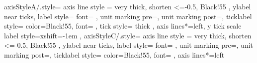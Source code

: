 





\pgfplotsset
{
	axisStyleA/.style=
	{
		axis line style =
		{
			very thick,
			shorten <=-0.5\pgflinewidth,
			Black!55
		},
		ylabel near ticks,
		label style=
		{
			font=\inplottext
		},
		unit marking pre={\inplottextsize\lbrack}, %
		unit marking post={\inplottextsize\rbrack},
		ticklabel style=
		{
			color=Black!55,
			font=\inplottextsize %
		},
		tick style=
		{
			thick
		},
		axis lines*=left,
		y tick scale label style={xshift=-1em}
	},
	axisStyleC/.style=
	{
		axis line style =
		{
			very thick,
			shorten <=-0.5\pgflinewidth,
			Black!55
		},
		ylabel near ticks,
		label style=
		{
			font=\inplottext
		},
		unit marking pre={\inplottext {}},
		unit marking post={},
		ticklabel style=
		{
			color=Black!55,
			font=\inplottextsize %
		},
		axis lines*=left
	}
}

